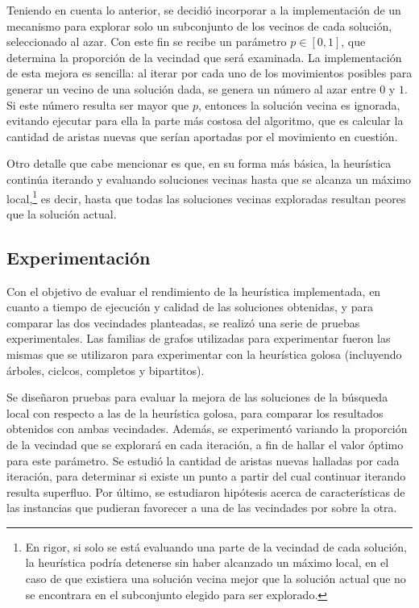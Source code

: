 Teniendo en cuenta lo anterior, se decidió incorporar a la implementación de
un mecanismo para explorar solo un subconjunto de los vecinos de cada solución,
seleccionado al azar. Con este fin se recibe un parámetro $p \in [0, 1]$, que
determina la proporción de la vecindad que será examinada. La implementación
de esta mejora es sencilla: al iterar por cada uno de los movimientos posibles
para generar un vecino de una solución dada, se genera un número al azar entre
$0$ y $1$. Si este número resulta ser mayor que $p$, entonces la solución
vecina es ignorada, evitando ejecutar para ella la parte más costosa del
algoritmo, que es calcular la cantidad de aristas nuevas que serían aportadas
por el movimiento en cuestión.

Otro detalle que cabe mencionar es que, en su forma más básica, la heurística
continúa iterando y evaluando soluciones vecinas hasta que se alcanza un
máximo local,\footnote{En rigor, si solo se está evaluando una parte de la
vecindad de cada solución, la heurística podría detenerse sin haber alcanzado
un máximo local, en el caso de que existiera una solución vecina mejor que la
solución actual que no se encontrara en el subconjunto elegido para ser
explorado.} es decir, hasta que todas las soluciones vecinas exploradas
resultan peores que la solución actual.

\subsection{Experimentación}

Con el objetivo de evaluar el rendimiento de la heurística implementada, en
cuanto a tiempo de ejecución y calidad de las soluciones obtenidas, y para
comparar las dos vecindades planteadas, se realizó una serie de pruebas
experimentales. Las familias de grafos utilizadas para experimentar fueron las
mismas que se utilizaron para experimentar con la heurística golosa
(incluyendo árboles, ciclcos, completos y bipartitos).

Se diseñaron pruebas para evaluar la mejora de las soluciones de la búsqueda
local con respecto a las de la heurística golosa, para comparar los resultados
obtenidos con ambas vecindades. Además, se experimentó variando la proporción
de la vecindad que se explorará en cada iteración, a fin de hallar el valor
óptimo para este parámetro. Se estudió la cantidad de aristas nuevas halladas
por cada iteración, para determinar si existe un punto a partir del cual
continuar iterando resulta superfluo. Por último, se estudiaron hipótesis
acerca de características de las instancias que pudieran favorecer a una de las
vecindades por sobre la otra.

